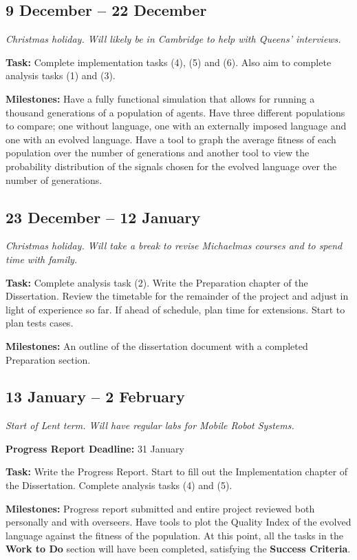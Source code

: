 \documentclass[12pt,a4paper,twoside]{article}
\begin{document}
\subsection*{9 December -- 22 December}

\emph{Christmas holiday. Will likely be in Cambridge to help with Queens' interviews.}

{\bf Task:} Complete implementation tasks (4), (5) and (6). Also aim to complete analysis tasks (1) and (3).

{\bf Milestones:} Have a fully functional simulation that allows for running a thousand generations of a population of agents. Have three different populations to compare; one without language, one with an externally imposed language and one with an evolved language. Have a tool to graph the average fitness of each population over the number of generations and another tool to view the probability distribution of the signals chosen for the evolved language over the number of generations.

\subsection*{23 December -- 12 January}

\emph{Christmas holiday. Will take a break to revise Michaelmas courses and to spend time with family.}

{\bf Task:} Complete analysis task (2). Write the Preparation chapter of the Dissertation. Review the timetable for the remainder of the project and adjust in light of experience so far. If ahead of schedule, plan time for extensions. Start to plan tests cases.

{\bf Milestones:} An outline of the dissertation document with a completed Preparation section.

\subsection*{13 January -- 2 February}

\emph{Start of Lent term. Will have regular labs for Mobile Robot Systems.}

{\bf Progress Report Deadline:} 31 January

{\bf Task:} Write the Progress Report. Start to fill out the Implementation chapter of the Dissertation. Complete analysis tasks (4) and (5).

{\bf Milestones:} Progress report submitted and entire project reviewed both personally and with overseers. Have tools to plot the Quality Index of the evolved language against the fitness of the population. At this point, all the tasks in the {\bf Work to Do} section will have been completed, satisfying the {\bf Success Criteria}.
\end{document}
